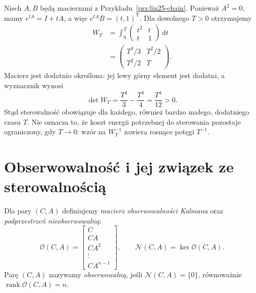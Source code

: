 \begin{przyklad}
\label{prz:lin25-gramian}
Niech \(A,B\) będą macierzami
z Przykładu~\ref{prz:lin25-chain}.
Ponieważ \(A^2=0\),
mamy \(e^{tA}=I+tA\),
a więc
\(e^{tA}B=(t,1)^{\mathsf T}\).
Dla dowolnego \(T>0\)
otrzymujemy
\[
 \begin{aligned}
 W_T&=\int_0^T
 \begin{pmatrix}t^2&t\\t&1\end{pmatrix}
 \,\mathrm dt\\
 &=\begin{pmatrix}
       T^3/3&T^2/2\\
       T^2/2&T
   \end{pmatrix}.
 \end{aligned}
\]
Macierz jest dodatnio określona:
jej lewy górny element
jest dodatni, a wyznacznik
wynosi
\[
 \det W_T=\frac{T^4}{3}
                -\frac{T^4}{4}
          =\frac{T^4}{12}>0.
\]
Stąd sterowalność obowiązuje
dla każdego, również bardzo
małego, dodatniego czasu \(T\).
Nie oznacza to,
że koszt energii potrzebnej
do sterowania pozostaje
ograniczony, gdy \(T\to0\):
wzór na \(W_T^{-1}\)
zawiera rosnące potęgi \(T^{-1}\).
\end{przyklad}

\section{Obserwowalność i jej związek ze sterowalnością}
\label{sec:lin25-observe}

\begin{definicja}
\label{def:lin25-observable}
Dla pary \((C,A)\)
definiujemy \emph{macierz
obserwowalności Kalmana}
oraz \emph{podprzestrzeń
nieobserwowalną}:
\[
 \mathcal O(C,A)=
 \begin{bmatrix}
 C\\CA\\CA^2\\\vdots\\CA^{n-1}
 \end{bmatrix},
 \qquad
 \mathcal N(C,A)=\ker\mathcal O(C,A).
\]
Parę \((C,A)\)
nazywamy \emph{obserwowalną},
jeśli \(\mathcal N(C,A)=\{0\}\),
równoważnie
\(\operatorname{rank}\mathcal O(C,A)=n\).
\end{definicja}

